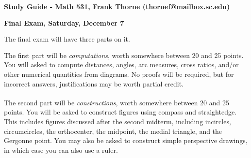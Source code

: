 \documentclass[12pt]{article}
\begin{document}
\setlength{\topmargin}{-2mm}





\begin{center}{\bf Study Guide - Math 531, Frank Thorne (thornef@mailbox.sc.edu)}
\end{center}
\begin{center}
{\bf Final Exam, Saturday, December 7}
\end{center}
The final exam will have three parts on it.

The first part will be {\itshape computations}, worth somewhere between 20 and 25 points. You will asked to compute distances,
angles, arc measures, cross ratios, and/or other numerical quantities from diagrams. No proofs will
be required, but for incorrect answers, justifications may be worth partial credit.
\\
\\
The second part will be {\itshape constructions}, worth somewhere between 20 and 25 points. You will be asked to construct
figures using compass and straightedge. This includes figures discussed after the second midterm, including incircles,
circumcircles, the orthocenter, the midpoint, the medial triangle, and the Gergonne point. You may also be asked to construct
simple perspective drawings, in which case you can also use a ruler.
\end{document}
